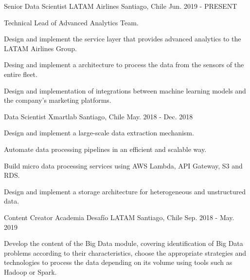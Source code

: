 

\begin{cventries}
  \cventry
    {Senior Data Scientist} %
    {LATAM Airlines} %
    {Santiago, Chile} %
    {Jun. 2019 - PRESENT} %
    {
      \begin{cvitems} %
        \item {Technical Lead of Advanced Analytics Team.}
        \item {Design and implement the service layer that provides advanced analytics to the LATAM Airlines Group.}
        \item {Desing and implement a architecture to process the data from the sensors of the entire fleet.}
        \item {Design and implementation of integrations between machine learning models and the company's marketing platforms.}
      \end{cvitems}
    }

  \cventry
    {Data Scientist} %
    {Xmartlab} %
    {Santiago, Chile} %
    {May. 2018 - Dec. 2018} %
    {
      \begin{cvitems} %
        \item {Design and implement a large-scale data extraction mechanism.}
        \item {Automate data processing pipelines in an efficient and scalable way.}
        \item {Build micro data processing services using AWS Lambda, API Gateway, S3 and RDS.}
        \item {Design and implement a storage architecture for heterogeneous and unstructured data.}
      \end{cvitems}
    }

\cventry
  {Content Creator} %
  {Academia Desafío LATAM} %
  {Santiago, Chile} %
  {Sep. 2018 - May. 2019} %
  {
    \begin{cvitems} %
      \item {Develop the content of the Big Data module, covering identification of Big Data problems according to their characteristics, choose the appropriate strategies and technologies to process the data depending on its volume using tools such as Hadoop or Spark.}
    \end{cvitems}
  }


\end{cventries}
